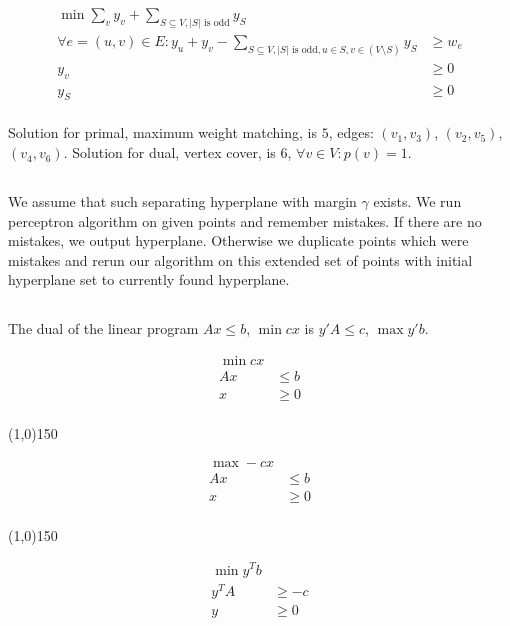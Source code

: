 \documentclass[a4paper,11pt,oneside,onecolumn]{article}
\def\zline{
    \vspace{-2.9em}
    \begin{center}\centering\line(1,0){150}\end{center}
    \vspace{-2.9em}
}
\begin{document}
\begin{align*}
\min \sum_v y_v + \sum_{S \subseteq V, |S| \textrm{ is odd}} y_S & \\
\forall e = (u,v) \in E: y_u + y_v - \sum_{S \subseteq V, |S| \textrm{ is odd}, u \in S, v \in (V \setminus S)} y_S & \ge w_e \\
y_v & \ge 0 \\
y_S & \ge 0 \\
\end{align*}

Solution for primal, maximum weight matching, is $5$, edges: $(v_1, v_3)$, $(v_2, v_5)$, $(v_4, v_6)$. Solution for dual, vertex
cover, is $6$, $\forall v \in V: p(v) = 1$.

\subsection{}

We assume that such separating hyperplane with margin $\gamma$ exists. We run perceptron algorithm on given points and remember mistakes. If there are no
mistakes, we output hyperplane. Otherwise we duplicate points which were mistakes and rerun our algorithm on this extended set of
points with initial hyperplane set to currently found hyperplane.

\subsection{}

The dual of the linear program $Ax \le b$, $\min cx$ is $y'A \le c$, $\max y'b$.

\begin{align*}
\min cx & \\
Ax & \le b \\
x & \ge 0 \\
\end{align*}

\zline

\begin{align*}
\max -cx & \\
Ax & \le b \\
x & \ge 0 \\
\end{align*}

\zline

\begin{align*}
\min y^Tb & \\
y^TA & \ge -c \\
y & \ge 0 \\
\end{align*}
\end{document}
